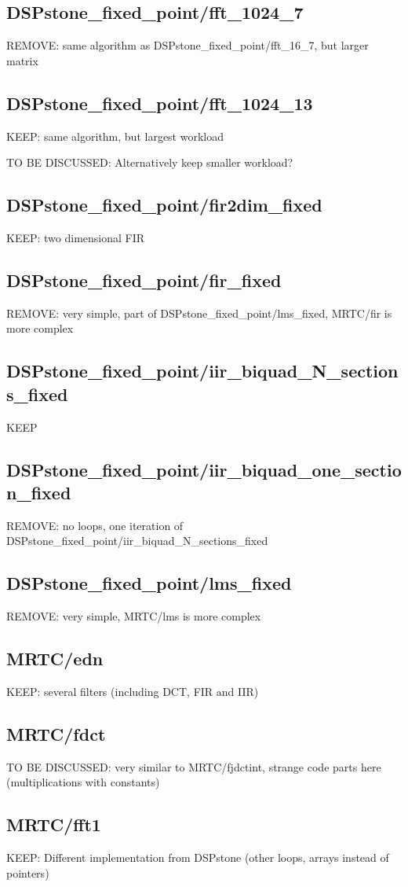 \documentclass[a4paper]{article}
\begin{document}
\subsection{DSPstone\_fixed\_point/fft\_1024\_7}
	REMOVE: same algorithm as DSPstone\_fixed\_point/fft\_16\_7, but larger matrix
\subsection{DSPstone\_fixed\_point/fft\_1024\_13}
	KEEP: same algorithm, but largest workload

	TO BE DISCUSSED: Alternatively keep smaller workload?
\subsection{DSPstone\_fixed\_point/fir2dim\_fixed}
	KEEP: two dimensional FIR
\subsection{DSPstone\_fixed\_point/fir\_fixed}
	REMOVE: very simple, part of DSPstone\_fixed\_point/lms\_fixed, MRTC/fir is more complex
\subsection{DSPstone\_fixed\_point/iir\_biquad\_N\_sections\_fixed}
	KEEP
\subsection{DSPstone\_fixed\_point/iir\_biquad\_one\_section\_fixed}
	REMOVE: no loops, one iteration of DSPstone\_fixed\_point/iir\_biquad\_N\_sections\_fixed
\subsection{DSPstone\_fixed\_point/lms\_fixed}
	REMOVE: very simple, MRTC/lms is more complex
\subsection{MRTC/edn}
	KEEP: several filters (including DCT, FIR and IIR)
\subsection{MRTC/fdct}
	TO BE DISCUSSED: very similar to MRTC/fjdctint, strange code parts here (multiplications with constants)
\subsection{MRTC/fft1}
	KEEP: Different implementation from DSPstone (other loops, arrays instead of pointers)
\end{document}
